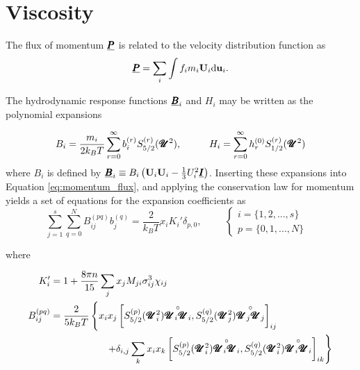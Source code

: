 \section{Viscosity}
The flux of momentum $\underline{\pmb{P}}$ is related to the velocity distribution function as 
\begin{equation}
    \underline{\pmb{P}} = \sum_i \int f_i m_i \boldsymbol{\mathrm{U}}_i \mathrm{d} \boldsymbol{\mathrm{u}}_i.
    \label{eq:momentum_flux}
\end{equation}

The hydrodynamic response functions $\underline{\pmb{B}}_i$ and $H_i$ may be written as the polynomial expansions

\begin{equation}
    B_i = \frac{m_i}{2 k_B T} \sum_{r = 0}^\infty b_i^{(r)} S_{5/2}^{(r)}(\pmb{\mathscr{U}}^2), \hspace{1cm} H_i = \sum_{r = 0}^{\infty} h_r^{(0)} S_{1/2}^{(r)}(\pmb{\mathscr{U}}^2)
\end{equation}
where $B_i$ is defined by $\underline{\pmb{B}}_i \equiv B_i\left( \boldsymbol{\mathrm{U}}_i \boldsymbol{\mathrm{U}}_i - \frac{1}{3}U_i^2 \underline{\pmb{I}}\right)$. Inserting these expansions into Equation \eqref{eq:momentum_flux}, and applying the conservation law for momentum yields a set of equations for the expansion coefficients as
\begin{equation}
    \sum_{j = 1}^s \sum_{q = 0}^N B_{ij}^{(pq)} b_j^{(q)} = \frac{2}{k_B T}x_i K_i' \delta_{p,0}, \hspace{1cm}
    \begin{cases}
        i = \{1, 2, ..., s\} &\\
        p = \{0, 1, ..., N\} &
    \end{cases}
\end{equation}

where 

\begin{equation}
    \begin{split}
        K_i' &= 1 + \frac{8 \pi n}{15} \sum_j x_j M_{ji} \sigma_{ij}^3 \chi_{ij}\\
        B_{ij}^{(pq)} &= \frac{2}{5 k_B T} \left\{ x_i x_j \left[ S_{5/2}^{(p)}(\pmb{\mathscr{U}}_i^2)\overset{\circ}{\pmb{\mathscr{U}}_i \pmb{\mathscr{U}}_i}, S_{5/2}^{(q)}(\pmb{\mathscr{U}}_j^2)\overset{\circ}{\pmb{\mathscr{U}}_j \pmb{\mathscr{U}}_j} \right]_{ij}\right. \\
        &\hspace{2cm} \left.+ \delta_{i,j} \sum_k x_i x_k \left[ S_{5/2}^{(p)}(\pmb{\mathscr{U}}_i^2)\overset{\circ}{\pmb{\mathscr{U}}_i \pmb{\mathscr{U}}_i}, S_{5/2}^{(q)}(\pmb{\mathscr{U}}_i^2)\overset{\circ}{\pmb{\mathscr{U}}_i \pmb{\mathscr{U}}_i} \right]_{ik}\right\}
    \end{split}
\end{equation}


